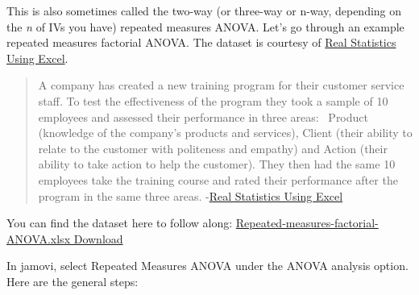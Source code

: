 \documentclass[
]{book}
\begin{document}
This is also sometimes called the two-way (or three-way or n-way, depending on the \emph{n} of IVs you have) repeated measures ANOVA. Let's go through an example repeated measures factorial ANOVA. The dataset is courtesy of \href{https://www.real-statistics.com/anova-repeated-measures/two-within-subjects-factors/}{Real Statistics Using Excel}.

\begin{quote}
A company has created a new training program for their customer service staff. To test the effectiveness of the program they took a sample of 10 employees and assessed their performance in three areas: ~Product (knowledge of the company's products and services), Client (their ability to relate to the customer with politeness and empathy) and Action (their ability to take action to help the customer). They then had the same 10 employees take the training course and rated their performance after the program in the same three areas. -\href{A\%20company\%20has\%20created\%20a\%20new\%20training\%20program\%20for\%20their\%20customer\%20service\%20staff.\%20To\%20test\%20the\%20effectiveness\%20of\%20the\%20program\%20they\%20took\%20a\%20sample\%20of\%2010\%20employees\%20and\%20assessed\%20their\%20performance\%20in\%20three\%20areas:\%20Product\%20(knowledge\%20of\%20the\%20company’s\%20products\%20and\%20services),\%20Client\%20(their\%20ability\%20to\%20relate\%20to\%20the\%20customer\%20with\%20politeness\%20and\%20empathy)\%20and\%20Action\%20(their\%20ability\%20to\%20take\%20action\%20to\%20help\%20the\%20customer).\%20They\%20then\%20had\%20the\%20same\%2010\%20employees\%20take\%20the\%20training\%20course\%20and\%20rated\%20their\%20performance\%20after\%20the\%20program\%20in\%20the\%20same\%20three\%20areas.\%20Based\%20on\%20the\%20data\%20in\%20Figure\%201,\%20determine\%20whether\%20the\%20program\%20was\%20effective.}{Real Statistics Using Excel}
\end{quote}

You can find the dataset here to follow along: \href{https://github.com/danawanzer/stats-with-jamovi/blob/master/data/Repeated-measures-factorial-ANOVA.xlsx}{Repeated-measures-factorial-ANOVA.xlsx Download}

In jamovi, select Repeated Measures ANOVA under the ANOVA analysis option. Here are the general steps:
\end{document}
